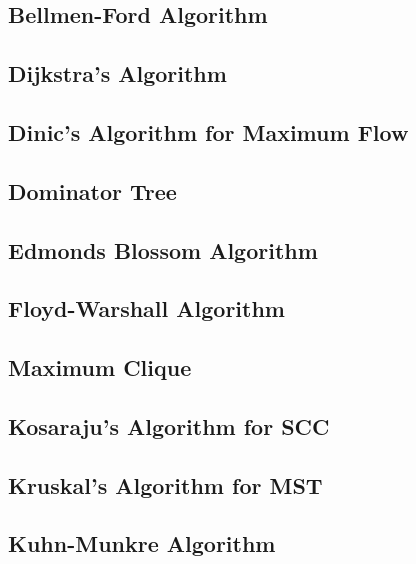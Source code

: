 \documentclass[a4paper,10pt,twocolumn,oneside]{article}
\newcommand{\inputcpp}[1]{}  %
\begin{document}
\subsection{Bellmen-Ford Algorithm}
\inputcpp{graph_theory/bellmen_ford.cpp}

\subsection{Dijkstra's Algorithm}
\inputcpp{graph_theory/dijkstra.cpp}

\subsection{Dinic's Algorithm for Maximum Flow}
\inputcpp{graph_theory/dinic.cpp}

\subsection{Dominator Tree}
\inputcpp{graph_theory/dominator_tree.cpp}

\subsection{Edmonds Blossom Algorithm}
\inputcpp{graph_theory/edmonds_blossom.cpp}

\subsection{Floyd-Warshall Algorithm}
\inputcpp{graph_theory/floyd_warshall.cpp}

\subsection{Maximum Clique}
\inputcpp{graph_theory/maximum_clique.cpp}

\subsection{Kosaraju's Algorithm for SCC}
\inputcpp{graph_theory/scc_kosaraju.cpp}

\subsection{Kruskal's Algorithm for MST}
\inputcpp{graph_theory/kruskal.cpp}

\subsection{Kuhn-Munkre Algorithm}
\inputcpp{graph_theory/kuhn_munkre_algorithm.cpp}
\end{document}
